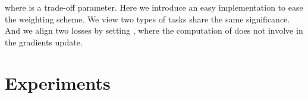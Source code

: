 \documentclass[10pt,twocolumn,letterpaper]{article}
\begin{document}
where  is a trade-off parameter. Here we introduce an easy implementation to ease the weighting scheme. We view two types of tasks share the same significance.
And we align two losses by setting , where the computation of  does not involve in the gradients update. 
\vspace{-4pt} \section{Experiments}
\vspace{-4pt}
\label{sec:exp}
\begin{table}
  \centering
  \caption{\textbf{Comparison results on CIFAR.} The results in the top block are obtained by training the best searched architecture; 
  the middle block is the average results for multiple runs of search.
  C10 and C100 denote the architectures are searched from CIFAR-10 and CIFAR-100 respectively.
All of our results are averaged by best searched architectures of four independent runs. 
  }
  \vspace{-6pt}
\end{table}
\end{document}
